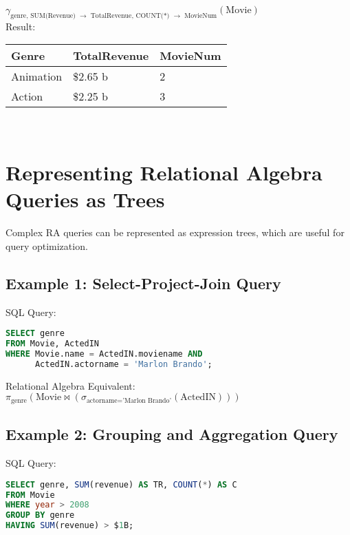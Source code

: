 \documentclass{article}
\newcommand{\sel}{\sigma} %
\newcommand{\proj}{\pi} %
\newcommand{\join}{\bowtie} %
\newcommand{\group}{\gamma} %
\begin{document}
$\group_{\text{genre, SUM(Revenue) \(\rightarrow\) TotalRevenue, COUNT(*) \(\rightarrow\) MovieNum}}(\text{Movie})$ \\

Result:\\

\begin{tabular}{|l|l|l|}
    \hline
    \textbf{Genre} & \textbf{TotalRevenue} & \textbf{MovieNum} \\
    \hline
    Animation & \$2.65 b & 2 \\
    Action & \$2.25 b & 3 \\
    \hline
\end{tabular}\\

\section*{Representing Relational Algebra Queries as Trees} 

Complex RA queries can be represented as expression trees, which are useful for query optimization.\\

\subsection*{Example 1: Select-Project-Join Query} 

SQL Query: \\

\begin{lstlisting}[language=SQL]
SELECT genre
FROM Movie, ActedIN
WHERE Movie.name = ActedIN.moviename AND
      ActedIN.actorname = 'Marlon Brando';
\end{lstlisting}
Relational Algebra Equivalent:
$\proj_{\text{genre}}(\text{Movie} \join (\sel_{\text{actorname='Marlon Brando'}}(\text{ActedIN})))$ 

\subsection*{Example 2: Grouping and Aggregation Query} 

SQL Query: \\

\begin{lstlisting}[language=SQL]
SELECT genre, SUM(revenue) AS TR, COUNT(*) AS C
FROM Movie
WHERE year > 2008
GROUP BY genre
HAVING SUM(revenue) > $1B;
\end{lstlisting}
\end{document}

